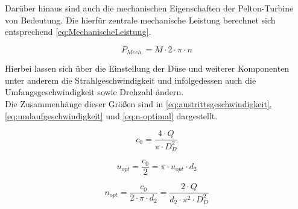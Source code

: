 Darüber hinaus sind auch die mechanischen Eigenschaften der Pelton-Turbine von Bedeutung.
Die hierfür zentrale mechanische Leistung berechnet sich entsprechend \autoref{eq:MechanischeLeistung}.

\begin{equation}
	P_{Mech.}= M \cdot 2 \cdot \pi \cdot n
\label{eq:MechanischeLeistung}
\end{equation}

Hierbei lassen sich über die Einstellung der Düse und weiterer Komponenten unter anderem die Strahlgeschwindigkeit
und infolgedessen auch die Umfangsgeschwindigkeit sowie Drehzahl ändern.\\
Die Zusammenhänge dieser Größen sind in \autoref{eq:austrittsgeschwindigkeit},\autoref{eq:umlaufgeschwindigkeit} und \autoref{eq:n-optimal} dargestellt.

\begin{equation}
    c_{0}=\frac{4 \cdot Q}{\pi \cdot D_{D}^2}
      \label{eq:austrittsgeschwindigkeit}
    \end{equation}

  \begin{equation}
    u_{opt} = \frac{c_{0}}{2}=\pi \cdot u_{opt} \cdot d_{2}
    \label{eq:umlaufgeschwindigkeit}
  \end{equation}
    
    \begin{equation}
     n_{opt}=\frac{c_{0}}{2 \cdot \pi \cdot d_{2}}=\frac{2 \cdot Q}{d_{2} \cdot \pi^2  \cdot D_{D}^2}
    \label{eq:n-optimal}
    \end{equation}
